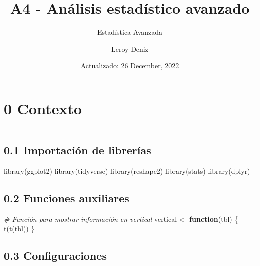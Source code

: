 \documentclass[
]{article}
\title{A4 - Análisis estadístico avanzado}
\subtitle{Estadística Avanzada}
\author{Leroy Deniz}
\date{Actualizado: 26 December, 2022}
\newenvironment{Shaded}{\begin{snugshade}}{\end{snugshade}}
\newcommand{\CommentTok}[1]{\textcolor[rgb]{0.56,0.35,0.01}{\textit{#1}}}
\newcommand{\ControlFlowTok}[1]{\textcolor[rgb]{0.13,0.29,0.53}{\textbf{#1}}}
\newcommand{\FunctionTok}[1]{\textcolor[rgb]{0.00,0.00,0.00}{#1}}
\newcommand{\NormalTok}[1]{#1}
\newcommand{\OtherTok}[1]{\textcolor[rgb]{0.56,0.35,0.01}{#1}}
\begin{document}
\maketitle

\tableofcontents

\newpage

\hypertarget{contexto}{%
\section{0 Contexto}\label{contexto}}

\begin{center}\rule{0.5\linewidth}{0.5pt}\end{center}

\hypertarget{importaciuxf3n-de-libreruxedas}{%
\subsection{0.1 Importación de
librerías}\label{importaciuxf3n-de-libreruxedas}}

\begin{Shaded}
\begin{Highlighting}[]
\FunctionTok{library}\NormalTok{(ggplot2)}
\FunctionTok{library}\NormalTok{(tidyverse)}
\FunctionTok{library}\NormalTok{(reshape2)}
\FunctionTok{library}\NormalTok{(stats)}
\FunctionTok{library}\NormalTok{(dplyr)}
\end{Highlighting}
\end{Shaded}

\hypertarget{funciones-auxiliares}{%
\subsection{0.2 Funciones auxiliares}\label{funciones-auxiliares}}

\begin{Shaded}
\begin{Highlighting}[]
\CommentTok{\# Función para mostrar información en vertical}
\NormalTok{vertical }\OtherTok{\textless{}{-}} \ControlFlowTok{function}\NormalTok{(tbl) \{}
    \FunctionTok{t}\NormalTok{(}\FunctionTok{t}\NormalTok{(tbl))}
\NormalTok{\}}
\end{Highlighting}
\end{Shaded}

\hypertarget{configuraciones}{%
\subsection{0.3 Configuraciones}\label{configuraciones}}
\end{document}
